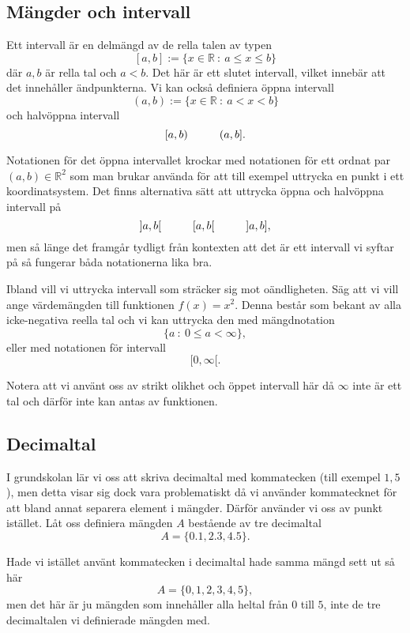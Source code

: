 \documentclass[titlepage]{article}
\begin{document}

\subsection{Mängder och intervall}

Ett intervall är en delmängd av de rella talen av typen
$$[a,b] := \{x \in \mathbb{R}\: : \: a\leq x \leq b\}$$
där $a,b$ är rella tal och $a<b$. Det här är ett slutet intervall, vilket innebär att det innehåller ändpunkterna. Vi kan också definiera öppna intervall 
$$(a,b) := \{x \in \mathbb{R} \: : \: a<x<b\}$$
och halvöppna intervall
$$[a,b) \hspace{10mm} (a,b].$$

Notationen för det öppna intervallet krockar med notationen för ett ordnat par $(a,b) \in \mathbb{R}^2$ som man brukar använda för att till exempel uttrycka en punkt i ett koordinatsystem. Det finns alternativa sätt att uttrycka öppna och halvöppna intervall på
$$]a,b[ \hspace{10mm} [a,b[ \hspace{10mm} ]a,b],$$
men så länge det framgår tydligt från kontexten att det är ett intervall vi syftar på så fungerar båda notationerna lika bra.

Ibland vill vi uttrycka intervall som sträcker sig mot oändligheten. Säg att vi vill ange värdemängden till funktionen $f(x) = x^2$. Denna består som bekant av alla icke-negativa reella tal och vi kan uttrycka den med mängdnotation
$$\{ a \: : \: 0 \leq a < \infty \},$$
eller med notationen för intervall
$$[0, \infty[.$$

Notera att vi använt oss av strikt olikhet och öppet intervall här då $\infty$ inte är ett tal och därför inte kan antas av funktionen.




\subsection{Decimaltal}

I grundskolan lär vi oss att skriva decimaltal med kommatecken (till exempel $1,5$), men detta visar sig dock vara problematiskt då vi använder kommatecknet för att bland annat separera element i mängder. Därför använder vi oss av punkt istället. Låt oss definiera mängden $A$ bestående av tre decimaltal
$$A = \{0.1,2.3,4.5\}.$$

Hade vi istället använt kommatecken i decimaltal hade samma mängd sett ut så här
$$A = \{0,1,2,3,4,5\},$$
men det här är ju mängden som innehåller alla heltal från $0$ till $5$, inte de tre decimaltalen vi definierade mängden med.
\end{document}
